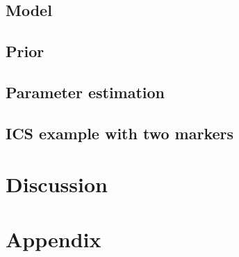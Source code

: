 \documentclass[11pt]{article}
\begin{document}
\subsection{Model}
\subsection{Prior}
\subsection{Parameter estimation}
\subsection{ICS example with two markers}
\section{Discussion}
\section{Appendix}



%
\end{document}
